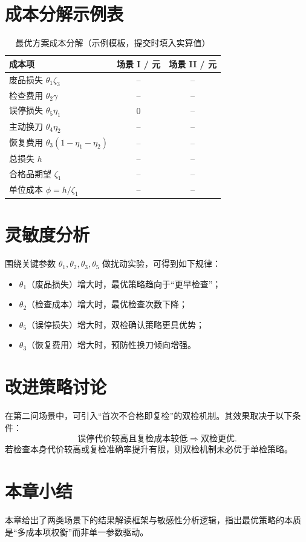 \section{成本分解示例表}
\begin{table}[H]
\centering
\caption{最优方案成本分解（示例模板，提交时填入实算值）}
\begin{tabular}{lcc}
\toprule
成本项 & 场景 I / 元 & 场景 II / 元 \\
\midrule
废品损失 $\theta_1\zeta_3$ & -- & -- \\
检查费用 $\theta_2\gamma$ & -- & -- \\
误停损失 $\theta_5\eta_1$ & 0 & -- \\
主动换刀 $\theta_4\eta_2$ & -- & -- \\
恢复费用 $\theta_3(1-\eta_1-\eta_2)$ & -- & -- \\
\midrule
总损失 $h$ & -- & -- \\
合格品期望 $\zeta_1$ & -- & -- \\
单位成本 $\phi=h/\zeta_1$ & -- & -- \\
\bottomrule
\end{tabular}
\end{table}

\section{灵敏度分析}
围绕关键参数 $\theta_1,\theta_2,\theta_3,\theta_5$ 做扰动实验，可得到如下规律：
\begin{itemize}
  \item $\theta_1$（废品损失）增大时，最优策略趋向于“更早检查”；
  \item $\theta_2$（检查成本）增大时，最优检查次数下降；
  \item $\theta_5$（误停损失）增大时，双检确认策略更具优势；
  \item $\theta_3$（恢复费用）增大时，预防性换刀倾向增强。
\end{itemize}

\section{改进策略讨论}
在第二问场景中，可引入“首次不合格即复检”的双检机制。其效果取决于以下条件：
\[
\text{误停代价较高且复检成本较低} \Longrightarrow \text{双检更优}.
\]
若检查本身代价较高或复检准确率提升有限，则双检机制未必优于单检策略。

\section{本章小结}
本章给出了两类场景下的结果解读框架与敏感性分析逻辑，指出最优策略的本质是“多成本项权衡”而非单一参数驱动。

